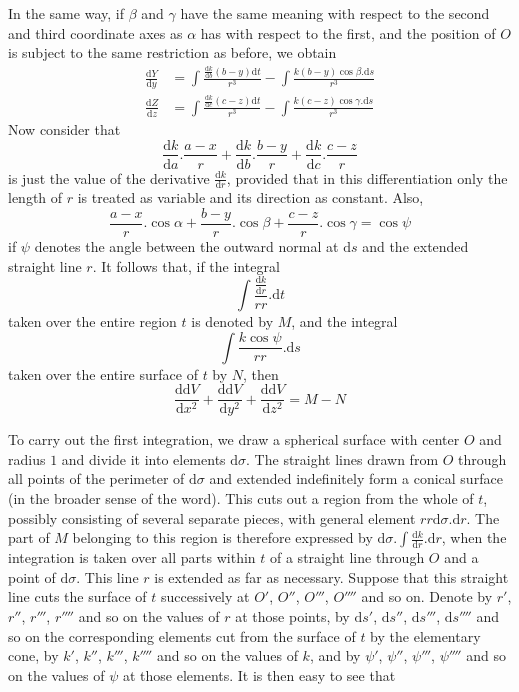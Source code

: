 In the same way, if $\beta$ and $\gamma$ have the same meaning with respect to the second and third coordinate axes as $\alpha$ has with respect to the first, and the position of $O$ is subject to the same restriction as before, we obtain
\[
\begin{aligned}
\frac{\mathrm{d}Y}{\mathrm{d}y}&=\int\frac{\frac{\mathrm{d}k}{\mathrm{d}b}(b-y)\mathrm{d}t}{r^3}-\int\frac{k(b-y)\cos\beta.\mathrm{d}s}{r^3}\\
\frac{\mathrm{d}Z}{\mathrm{d}z}&=\int\frac{\frac{\mathrm{d}k}{\mathrm{d}c}(c-z)\mathrm{d}t}{r^3}-\int\frac{k(c-z)\cos\gamma.\mathrm{d}s}{r^3}
\end{aligned}
\]
Now consider that
\[
\frac{\mathrm{d}k}{\mathrm{d}a}.\frac{a-x}{r}+\frac{\mathrm{d}k}{\mathrm{d}b}.\frac{b-y}{r}+\frac{\mathrm{d}k}{\mathrm{d}c}.\frac{c-z}{r}
\]
%
is just the value of the derivative $\frac{\mathrm{d}k}{\mathrm{d}r}$, provided that in this differentiation only the length of $r$ is treated as variable and its direction as constant. Also,
\[
\frac{a-x}{r}.\cos\alpha+\frac{b-y}{r}.\cos\beta+\frac{c-z}{r}.\cos\gamma=\cos\psi
\]
if $\psi$ denotes the angle between the outward normal at $\mathrm{d}s$ and the extended straight line $r$. It follows that, if the integral
\[
\int\frac{\frac{\mathrm{d}k}{\mathrm{d}r}}{rr}.\mathrm{d}t
\]
taken over the entire region $t$ is denoted by $M$, and the integral
\[
\int\frac{k\cos\psi}{rr}.\mathrm{d}s
\]
taken over the entire surface of $t$ by $N$, then
\[
\frac{\mathrm{d}\mathrm{d}V}{\mathrm{d}x^2}+\frac{\mathrm{d}\mathrm{d}V}{\mathrm{d}y^2}+\frac{\mathrm{d}\mathrm{d}V}{\mathrm{d}z^2}=M-N
\]

To carry out the first integration, we draw a spherical surface with center $O$ and radius $1$ and divide it into elements $\mathrm{d}\sigma$. The straight lines drawn from $O$ through all points of the perimeter of $\mathrm{d}\sigma$ and extended indefinitely form a conical surface (in the broader sense of the word). This cuts out a region from the whole of $t$, possibly consisting of several separate pieces, with general element $rr\mathrm{d}\sigma.\mathrm{d}r$. The part of $M$ belonging to this region is therefore expressed by $\mathrm{d}\sigma.\int\frac{\mathrm{d}k}{\mathrm{d}r}.\mathrm{d}r$, when the integration is taken over all parts within $t$ of a straight line through $O$ and a point of $\mathrm{d}\sigma$. This line $r$ is extended as far as necessary. Suppose that this straight line cuts the surface of $t$ successively at $O'$, $O''$, $O'''$, $O''''$ and so on. Denote by $r'$, $r''$, $r'''$, $r''''$ and so on the values of $r$ at those points, by $\mathrm{d}s'$, $\mathrm{d}s''$, $\mathrm{d}s'''$, $\mathrm{d}s''''$ and so on the corresponding elements cut from the surface of $t$ by the elementary cone, by $k'$, $k''$, $k'''$, $k''''$ and so on the values of $k$, and by $\psi'$, $\psi''$, $\psi'''$, $\psi''''$ and so on the values of $\psi$ at those elements. It is then easy to see that
%

